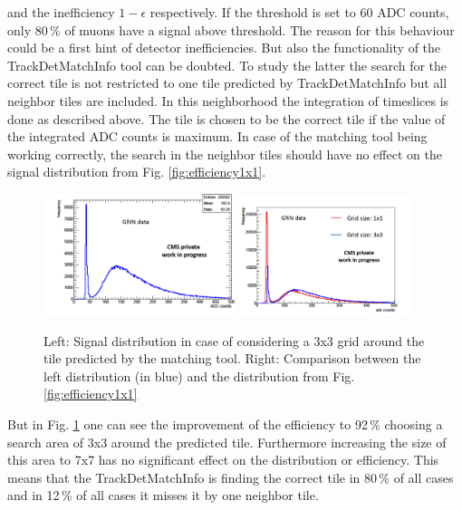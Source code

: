 			and the inefficiency $1-\epsilon$ respectively.
			If the threshold is set to 60 ADC counts, only 80\,\% of muons have a signal above threshold.
			The reason for this behaviour could be a first hint of detector inefficiencies.
			But also the functionality of the TrackDetMatchInfo tool can be doubted.
			To study the latter the search for the correct tile is not restricted to one tile predicted by TrackDetMatchInfo but all neighbor tiles are included.
			In this neighborhood the integration of timeslices is done as described above.
			The tile is chosen to be the correct tile if the value of the integrated ADC counts is maximum.
			In case of the matching tool being working correctly, the search in the neighbor tiles should have no effect on the signal distribution from Fig. \ref{fig:efficiency1x1}.
			\begin{figure}[htbp]
				\centering
				\includegraphics[width=0.5\textwidth]{Figures/erdogan/neighborhood2.png}
				\includegraphics[width=0.45\textwidth]{Figures/erdogan/neighborhood.png}
				\caption{Left: Signal distribution in case of considering a 3x3 grid around the tile predicted by the matching tool. Right: Comparison between the left distribution (in blue) and the distribution from Fig. \ref{fig:efficiency1x1}}
				\label{fig:neighborhood}
			\end{figure}
			But in Fig. \ref{fig:neighborhood} one can see the improvement of the efficiency to 92\,\% choosing a search area of 3x3 around the predicted tile.
			Furthermore increasing the size of this area to 7x7 has no significant effect on the distribution or efficiency.
			This means that the TrackDetMatchInfo is finding the correct tile in 80\,\% of all cases and in 12\,\% of all cases it misses it by one neighbor tile.
